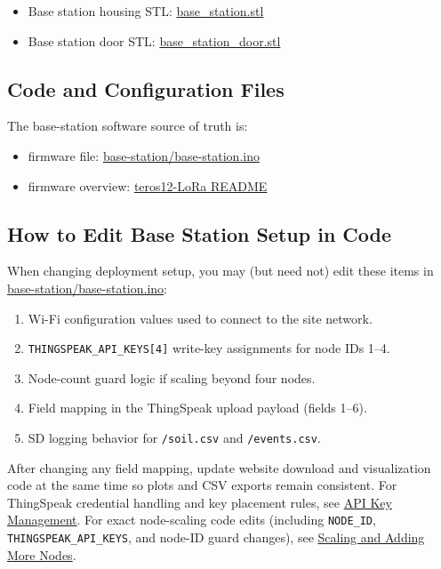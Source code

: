 \documentclass[11pt]{article}
\newcommand{\firmwarereadme}{\href{https://github.com/benjamenm03/teros12-LoRa/blob/main/README.md}{teros12-LoRa README}}
\newcommand{\basefirmware}{\href{https://github.com/benjamenm03/teros12-LoRa/blob/main/base-station/base-station.ino}{base-station/base-station.ino}}
\begin{document}
\begin{itemize}
    \item Base station housing STL: \href{https://benmiller.us/assets/base_station.stl}{base\_station.stl}
    \item Base station door STL: \href{https://benmiller.us/assets/base_station_door.stl}{base\_station\_door.stl}
\end{itemize}

\subsection{Code and Configuration Files}
The base-station software source of truth is:
\begin{itemize}
    \item firmware file: \basefirmware{}
    \item firmware overview: \firmwarereadme{}
\end{itemize}

\subsection{How to Edit Base Station Setup in Code}
When changing deployment setup, you may (but need not) edit these items in \basefirmware{}:
\begin{enumerate}
    \item Wi-Fi configuration values used to connect to the site network.
    \item \texttt{THINGSPEAK\_API\_KEYS[4]} write-key assignments for node IDs 1--4.
    \item Node-count guard logic if scaling beyond four nodes.
    \item Field mapping in the ThingSpeak upload payload (fields 1--6).
    \item SD logging behavior for \texttt{/soil.csv} and \texttt{/events.csv}.
\end{enumerate}

After changing any field mapping, update website download and visualization code at the same time so plots and CSV exports remain consistent.
For ThingSpeak credential handling and key placement rules, see \hyperref[subsec:api-key-management]{API Key Management}.
For exact node-scaling code edits (including \texttt{NODE\_ID}, \texttt{THINGSPEAK\_API\_KEYS}, and node-ID guard changes), see \hyperref[sec:scaling-nodes]{Scaling and Adding More Nodes}.
\end{document}
